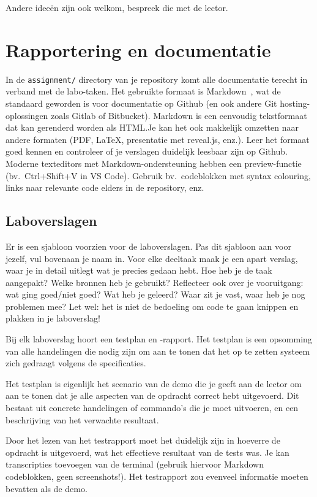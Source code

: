 Andere ideeën zijn ook welkom, bespreek die met de lector. 

\section{Rapportering en documentatie}%
\label{sec:rapportering-en-documentatie}

In de \texttt{assignment/} directory van je repository komt alle documentatie terecht in verband met de labo-taken. Het gebruikte formaat is Markdown~\autocite{Gruber2004,Github2016}, wat de standaard geworden is voor documentatie op Github (en ook andere Git hosting-oplossingen zoals Gitlab of Bitbucket). Markdown is een eenvoudig tekstformaat dat kan gerenderd worden als HTML.\@ Je kan het ook makkelijk omzetten naar andere formaten (PDF, {\LaTeX}, presentatie met reveal.js, enz.). Leer het formaat goed kennen en controleer of je verslagen duidelijk leesbaar zijn op Github. Moderne texteditors met Markdown-ondersteuning hebben een preview-functie (bv.\ Ctrl+Shift+V in VS Code). Gebruik bv.\ codeblokken met syntax colouring, links naar relevante code elders in de repository, enz.

\subsection{Laboverslagen}%
\label{subs:laboverslagen}

Er is een sjabloon voorzien voor de laboverslagen. Pas dit sjabloon aan voor jezelf, vul bovenaan je naam in. Voor elke deeltaak maak je een apart verslag, waar je in detail uitlegt wat je precies gedaan hebt. Hoe heb je de taak aangepakt? Welke bronnen heb je gebruikt? Reflecteer ook over je vooruitgang: wat ging goed/niet goed? Wat heb je geleerd? Waar zit je vast, waar heb je nog problemen mee? Let wel: het is niet de bedoeling om code te gaan knippen en plakken in je laboverslag!

Bij elk laboverslag hoort een testplan en -rapport. Het testplan is een opsomming van alle handelingen die nodig zijn om aan te tonen dat het op te zetten systeem zich gedraagt volgens de specificaties.

Het testplan is eigenlijk het scenario van de demo die je geeft aan de lector om aan te tonen dat je alle aspecten van de opdracht correct hebt uitgevoerd. Dit bestaat uit concrete handelingen of commando's die je moet uitvoeren, en een beschrijving van het verwachte resultaat.

Door het lezen van het testrapport moet het duidelijk zijn in hoeverre de opdracht is uitgevoerd, wat het effectieve resultaat van de tests was. Je kan transcripties toevoegen van de terminal (gebruik hiervoor Markdown codeblokken, geen screenshots!). Het testrapport zou evenveel informatie moeten bevatten als de demo.

